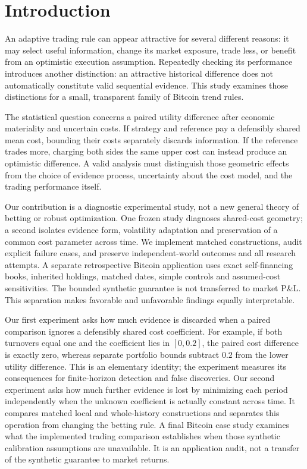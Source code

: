 \section{Introduction}

An adaptive trading rule can appear attractive for several different reasons:
it may select useful information, change its market exposure, trade less, or
benefit from an optimistic execution assumption. Repeatedly checking its
performance introduces another distinction: an attractive historical difference
does not automatically constitute valid sequential evidence. This study examines
those distinctions for a small, transparent family of Bitcoin trend rules.

The statistical question concerns a paired utility difference after economic
materiality and uncertain costs. If strategy and reference pay a defensibly
shared mean cost, bounding their costs separately discards information. If the
reference trades more, charging both sides the same upper cost can instead
produce an optimistic difference. A valid analysis must distinguish those
geometric effects from the choice of evidence process, uncertainty about the
cost model, and the trading performance itself.

Our contribution is a diagnostic experimental study, not a new general theory
of betting or robust optimization. One frozen study diagnoses shared-cost
geometry; a second isolates evidence form, volatility adaptation and preservation
of a common cost parameter across time. We implement matched constructions,
audit explicit failure cases, and preserve independent-world outcomes and all
research attempts. A separate retrospective Bitcoin application uses exact
self-financing books, inherited holdings, matched dates, simple controls and
assumed-cost sensitivities. The bounded synthetic guarantee is not transferred
to market P\&L. This separation makes favorable and unfavorable findings equally
interpretable.

Our first experiment asks how much evidence is discarded when a paired
comparison ignores a defensibly shared cost coefficient. For example, if both
turnovers equal one and the coefficient lies in $[0,0.2]$, the paired cost
difference is exactly zero, whereas separate portfolio bounds subtract $0.2$
from the lower utility difference. This is an elementary identity; the
experiment measures its consequences for finite-horizon detection and false
discoveries. Our second experiment asks how much further evidence is lost by
minimizing each period independently when the unknown coefficient is actually
constant across time. It compares matched local and whole-history constructions
and separates this operation from changing the betting rule. A final Bitcoin
case study examines what the implemented trading comparison establishes when
those synthetic calibration assumptions are unavailable. It is an application
audit, not a transfer of the synthetic guarantee to market returns.

